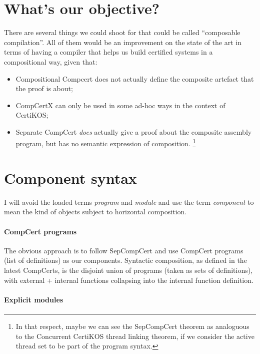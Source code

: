 \documentclass[11pt]{article}
\begin{document}
\section{What's our objective?} %

There are several things we could shoot for
that could be called ``composable compilation''.
All of them would be an improvement on
the state of the art in terms of
having a compiler that helps us build certified systems
in a compositional way,
given that:
\begin{itemize}
  \item Compositional Compcert \cite{compcompcert}
    does not actually define the composite artefact
    that the proof is about;
  \item CompCertX can only be used in some ad-hoc ways
    in the context of CertiKOS;
  \item Separate CompCert \cite{sepcompcert}
    \emph{does} actually give a proof about
    the composite assembly program,
    but has no semantic expression of composition.%
    \footnote{%
      In that respect,
      maybe we can see the SepCompCert theorem
      as analoguous to the Concurrent CertiKOS thread linking theorem,
      if we consider the active thread set to be part of the program syntax.
    }
\end{itemize}


\section{Component syntax} %

I will avoid the loaded terms \emph{program} and \emph{module}
and use the term \emph{component}
to mean the kind of objects subject to horizontal composition.

\paragraph{CompCert programs} %

The obvious approach is to follow SepCompCert and
use CompCert programs (list of definitions) as our components.
Syntactic composition, as defined in the latest CompCerts,
is the disjoint union of programs (taken as sets of definitions),
with external + internal functions
collapsing into the internal function definition.


\paragraph{Explicit modules} %
\end{document}
